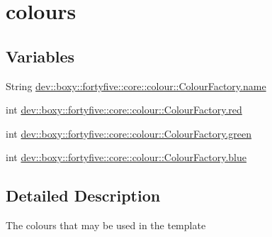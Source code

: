 \hypertarget{group__colours}{
\section{colours}
\label{da/d58/group__colours}
}
\subsection*{Variables}
\begin{DoxyCompactItemize}
\item 
String \hyperlink{group__colours_ga4d56f9874f82e7285e41c8a295069047}{dev::boxy::fortyfive::core::colour::ColourFactory.name}
\item 
int \hyperlink{group__colours_gab62f99627952fcf9923c257b8a6da024}{dev::boxy::fortyfive::core::colour::ColourFactory.red}
\item 
int \hyperlink{group__colours_gab377d979269fd05f929493dc79ee074a}{dev::boxy::fortyfive::core::colour::ColourFactory.green}
\item 
int \hyperlink{group__colours_gaa387e90b3938158d073d2aeae5105111}{dev::boxy::fortyfive::core::colour::ColourFactory.blue}
\end{DoxyCompactItemize}


\subsection{Detailed Description}
The colours that may be used in the template 


